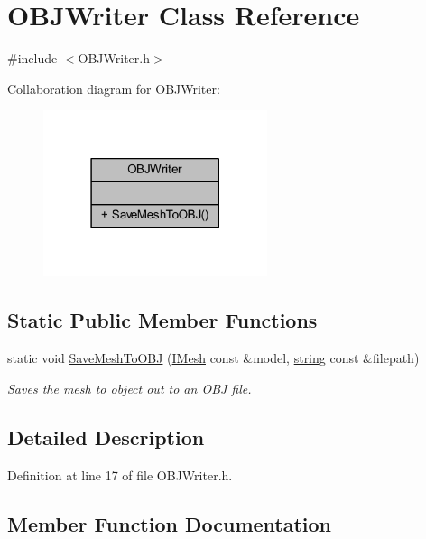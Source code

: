 \hypertarget{class_o_b_j_writer}{}\section{O\+B\+J\+Writer Class Reference}
\label{class_o_b_j_writer}


{\ttfamily \#include $<$O\+B\+J\+Writer.\+h$>$}



Collaboration diagram for O\+B\+J\+Writer\+:\nopagebreak
\begin{figure}[H]
\begin{center}
\leavevmode
\includegraphics[width=186pt]{class_o_b_j_writer__coll__graph}
\end{center}
\end{figure}
\subsection*{Static Public Member Functions}
\begin{DoxyCompactItemize}
\item 
static void \hyperlink{class_o_b_j_writer_a99cb9b1c28fa4c59c8087a9c1c6899e3}{Save\+Mesh\+To\+O\+BJ} (\hyperlink{class_i_mesh}{I\+Mesh} const \&model, \hyperlink{_types_8h_ad453f9f71ce1f9153fb748d6bb25e454}{string} const \&filepath)
\begin{DoxyCompactList}\small\item\em Saves the mesh to object out to an O\+BJ file. \end{DoxyCompactList}\end{DoxyCompactItemize}


\subsection{Detailed Description}


Definition at line 17 of file O\+B\+J\+Writer.\+h.



\subsection{Member Function Documentation}
